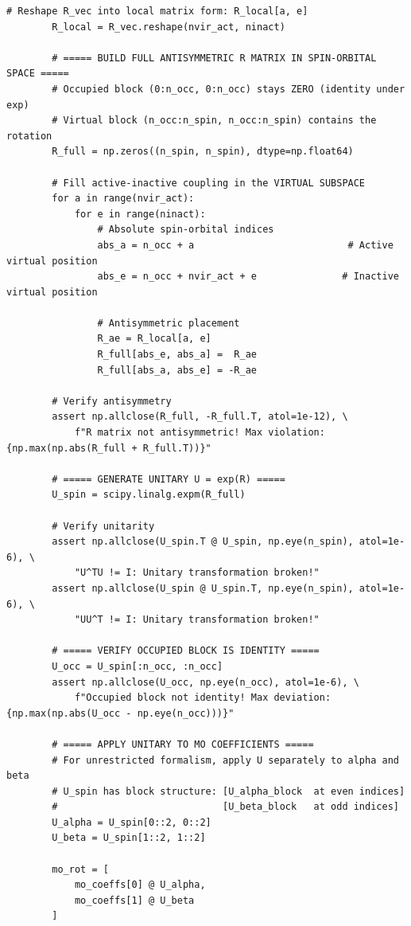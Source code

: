 \begin{lstlisting}[style=python, caption={...}, label=lst:full_code]
        # Reshape R_vec into local matrix form: R_local[a, e]
        R_local = R_vec.reshape(nvir_act, ninact)
        
        # ===== BUILD FULL ANTISYMMETRIC R MATRIX IN SPIN-ORBITAL SPACE =====
        # Occupied block (0:n_occ, 0:n_occ) stays ZERO (identity under exp)
        # Virtual block (n_occ:n_spin, n_occ:n_spin) contains the rotation
        R_full = np.zeros((n_spin, n_spin), dtype=np.float64)
        
        # Fill active-inactive coupling in the VIRTUAL SUBSPACE
        for a in range(nvir_act):
            for e in range(ninact):
                # Absolute spin-orbital indices
                abs_a = n_occ + a                           # Active virtual position
                abs_e = n_occ + nvir_act + e               # Inactive virtual position
                
                # Antisymmetric placement
                R_ae = R_local[a, e]
                R_full[abs_e, abs_a] =  R_ae
                R_full[abs_a, abs_e] = -R_ae
        
        # Verify antisymmetry
        assert np.allclose(R_full, -R_full.T, atol=1e-12), \
            f"R matrix not antisymmetric! Max violation: {np.max(np.abs(R_full + R_full.T))}"
        
        # ===== GENERATE UNITARY U = exp(R) =====
        U_spin = scipy.linalg.expm(R_full)
        
        # Verify unitarity
        assert np.allclose(U_spin.T @ U_spin, np.eye(n_spin), atol=1e-6), \
            "U^TU != I: Unitary transformation broken!"
        assert np.allclose(U_spin @ U_spin.T, np.eye(n_spin), atol=1e-6), \
            "UU^T != I: Unitary transformation broken!"
        
        # ===== VERIFY OCCUPIED BLOCK IS IDENTITY =====
        U_occ = U_spin[:n_occ, :n_occ]
        assert np.allclose(U_occ, np.eye(n_occ), atol=1e-6), \
            f"Occupied block not identity! Max deviation: {np.max(np.abs(U_occ - np.eye(n_occ)))}"
        
        # ===== APPLY UNITARY TO MO COEFFICIENTS =====
        # For unrestricted formalism, apply U separately to alpha and beta
        # U_spin has block structure: [U_alpha_block  at even indices]
        #                             [U_beta_block   at odd indices]
        U_alpha = U_spin[0::2, 0::2]
        U_beta = U_spin[1::2, 1::2]
        
        mo_rot = [
            mo_coeffs[0] @ U_alpha,
            mo_coeffs[1] @ U_beta
        ]
        

\end{lstlisting}
